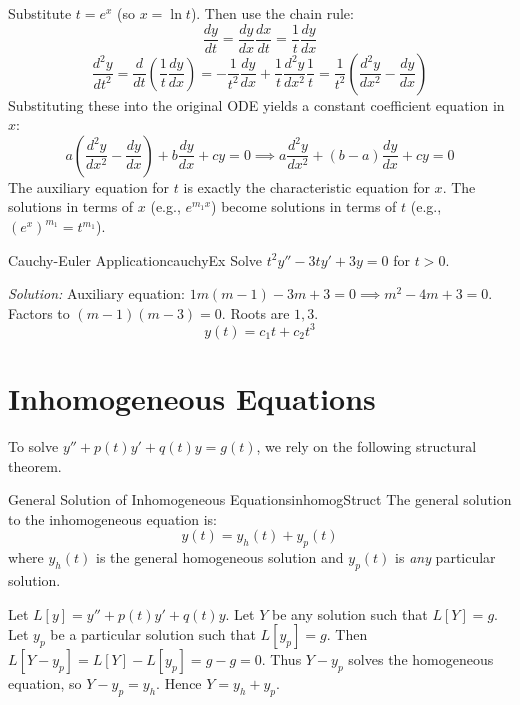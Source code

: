 \documentclass{book}
\newenvironment{Proof}[1][]
  {\begin{ProofTcb}[#1]}
  {\end{ProofTcb}}
\begin{document}
\begin{Proof}
    Substitute $t = e^x$ (so $x = \ln t$). Then use the chain rule:
    \[
        \frac{dy}{dt} = \frac{dy}{dx}\frac{dx}{dt} = \frac{1}{t}\frac{dy}{dx}
    \]
    \[
        \frac{d^2y}{dt^2} = \frac{d}{dt}\left(\frac{1}{t}\frac{dy}{dx}\right) = -\frac{1}{t^2}\frac{dy}{dx} + \frac{1}{t}\frac{d^2y}{dx^2}\frac{1}{t} = \frac{1}{t^2}\left(\frac{d^2y}{dx^2} - \frac{dy}{dx}\right)
    \]
    Substituting these into the original ODE yields a constant coefficient equation in $x$:
    \[
        a\left(\frac{d^2y}{dx^2} - \frac{dy}{dx}\right) + b\frac{dy}{dx} + cy = 0 \implies a\frac{d^2y}{dx^2} + (b-a)\frac{dy}{dx} + cy = 0
    \]
    The auxiliary equation for $t$ is exactly the characteristic equation for $x$. The solutions in terms of $x$ (e.g., $e^{m_1 x}$) become solutions in terms of $t$ (e.g., $(e^x)^{m_1} = t^{m_1}$).
\end{Proof}

\begin{example}{Cauchy-Euler Application}{cauchyEx}
    Solve $t^2 y'' - 3ty' + 3y = 0$ for $t>0$.

    \emph{Solution:}
    Auxiliary equation: $1m(m-1) - 3m + 3 = 0 \implies m^2 - 4m + 3 = 0$.
    Factors to $(m-1)(m-3)=0$. Roots are $1, 3$.
    \[
        y(t) = c_1 t + c_2 t^3
    \]
\end{example}

\section{Inhomogeneous Equations}

To solve $y'' + p(t)y' + q(t)y = g(t)$, we rely on the following structural theorem.

\begin{thm}{General Solution of Inhomogeneous Equations}{inhomogStruct}
    The general solution to the inhomogeneous equation is:
    \[
        y(t) = y_h(t) + y_p(t)
    \]
    where $y_h(t)$ is the general homogeneous solution and $y_p(t)$ is \emph{any} particular solution.
\end{thm}

\begin{Proof}
    Let $L[y] = y'' + p(t)y' + q(t)y$. Let $Y$ be any solution such that $L[Y] = g$. Let $y_p$ be a particular solution such that $L[y_p] = g$.
    Then $L[Y - y_p] = L[Y] - L[y_p] = g - g = 0$. Thus $Y - y_p$ solves the homogeneous equation, so $Y - y_p = y_h$. Hence $Y = y_h + y_p$.
\end{Proof}
\end{document}
